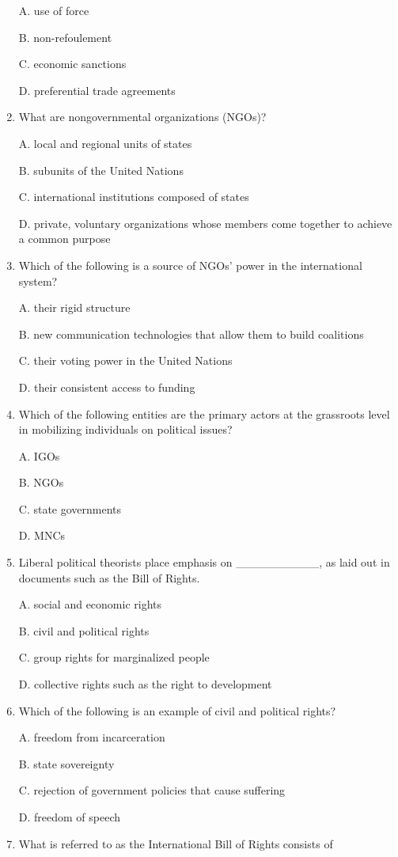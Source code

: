\documentclass[
]{book}
\begin{document}
\begin{enumerate}
  A. use of force

  B. non-refoulement

  C. economic sanctions

  D. preferential trade agreements
\item
  What are nongovernmental organizations (NGOs)?

  A. local and regional units of states

  B. subunits of the United Nations

  C. international institutions composed of states

  D. private, voluntary organizations whose members come together to achieve a common purpose
\item
  Which of the following is a source of NGOs' power in the international system?

  A. their rigid structure

  B. new communication technologies that allow them to build coalitions

  C. their voting power in the United Nations

  D. their consistent access to funding
\item
  Which of the following entities are the primary actors at the grassroots level in mobilizing individuals on political issues?

  A. IGOs

  B. NGOs

  C. state governments

  D. MNCs
\item
  Liberal political theorists place emphasis on \_\_\_\_\_\_\_\_\_\_, as laid out in documents such as the Bill of Rights.

  A. social and economic rights

  B. civil and political rights

  C. group rights for marginalized people

  D. collective rights such as the right to development
\item
  Which of the following is an example of civil and political rights?

  A. freedom from incarceration

  B. state sovereignty

  C. rejection of government policies that cause suffering

  D. freedom of speech
\item
  What is referred to as the International Bill of Rights consists of


\end{enumerate}
\end{document}
